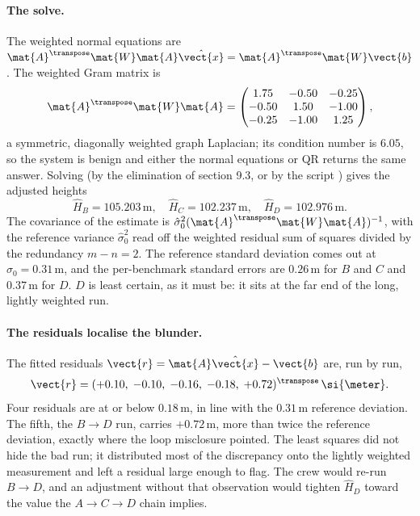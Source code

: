 \paragraph{The solve.}
The weighted normal equations are $\mat{A}^{\transpose}\mat{W}\mat{A}
\hat{\vect{x}} = \mat{A}^{\transpose}\mat{W}\vect{b}$. The weighted
Gram matrix is
\[
\mat{A}^{\transpose}\mat{W}\mat{A} = \begin{pmatrix}
1.75 & -0.50 & -0.25 \\
-0.50 & 1.50 & -1.00 \\
-0.25 & -1.00 & 1.25
\end{pmatrix},
\]
a symmetric, diagonally weighted graph Laplacian; its condition
number is $6.05$, so the system is benign and either the normal
equations or QR returns the same answer. Solving (by the elimination
of section 9.3, or by the script
) gives the adjusted heights
\[
\hat{H}_{B} = 105.203\,\si{\meter}, \quad
\hat{H}_{C} = 102.237\,\si{\meter}, \quad
\hat{H}_{D} = 102.976\,\si{\meter}.
\]
The covariance of the estimate is $\hat{\sigma}_{0}^{2}
(\mat{A}^{\transpose}\mat{W}\mat{A})^{-1}$, with the reference
variance $\hat{\sigma}_{0}^{2}$ read off the weighted residual sum of
squares divided by the redundancy $m - n = 2$. The reference standard
deviation comes out at $\hat{\sigma}_{0} = 0.31\,\si{\meter}$, and the
per-benchmark standard errors are $0.26\,\si{\meter}$ for $B$ and $C$
and $0.37\,\si{\meter}$ for $D$. $D$ is least certain, as it must be:
it sits at the far end of the long, lightly weighted run.

\paragraph{The residuals localise the blunder.}
The fitted residuals $\vect{r} = \mat{A}\hat{\vect{x}} - \vect{b}$
are, run by run,
\[
\vect{r} = (+0.10,\; -0.10,\; -0.16,\; -0.18,\; +0.72)^{\transpose}\,
\si{\meter}.
\]
Four residuals are at or below $0.18\,\si{\meter}$, in line with the
$0.31\,\si{\meter}$ reference deviation. The fifth, the $B \to D$
run, carries $+0.72\,\si{\meter}$, more than twice the reference
deviation, exactly where the loop misclosure pointed. The least
squares did not hide the bad run; it distributed most of the
discrepancy onto the lightly weighted measurement and left a residual
large enough to flag. The crew would re-run $B \to D$, and an
adjustment without that observation would tighten $\hat{H}_{D}$
toward the value the $A \to C \to D$ chain implies.

